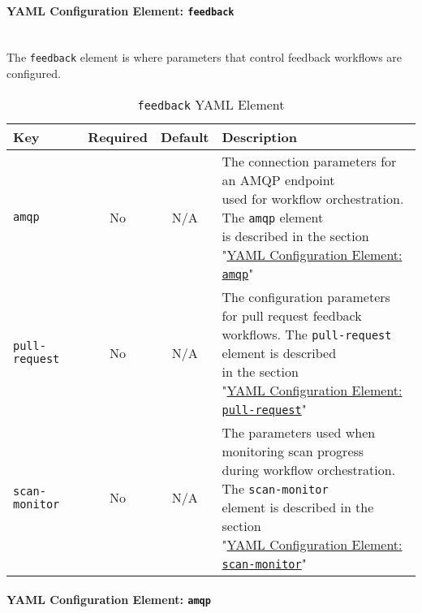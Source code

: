 \paragraph{YAML Configuration Element: \texttt{feedback} }\label{sec:feedback-element}

\noindent\\The \texttt{feedback} element is where parameters that control feedback
workflows are configured.

\begin{table}[h]
    \caption{\texttt{feedback} YAML Element}  
    \label{tab:feedback-section-keys}      
    \begin{tabularx}{\textwidth}{lccl}
        \toprule
        \textbf{Key} & \textbf{Required} & \textbf{Default} & \textbf{Description}\\
        \midrule
        \texttt{amqp} & No & N/A & \makecell[l]{The connection parameters for an AMQP endpoint
        \\used for workflow orchestration. The \texttt{amqp} element
        \\is described in the section
        \\"\hyperref[sec:amqp-element]{YAML Configuration Element: \texttt{amqp}}"}\\
        \midrule
        \texttt{pull-request} & No & N/A & \makecell[l]{The configuration parameters for
        pull request feedback\\workflows. The \texttt{pull-request} element is described
        \\in the section
        \\"\hyperref[sec:pull-request-element]{YAML Configuration Element: \texttt{pull-request}}"}\\
        \midrule
        \texttt{scan-monitor} & No & N/A & \makecell[l]{The parameters used when monitoring scan
        progress\\during workflow orchestration. The \texttt{scan-monitor}\\element
        is described in the section
        \\"\hyperref[sec:scan-monitor-element]{YAML Configuration Element: \texttt{scan-monitor}}"}\\
        \bottomrule
    \end{tabularx}
\end{table}


\paragraph{YAML Configuration Element: \texttt{amqp} }\label{sec:amqp-element}

